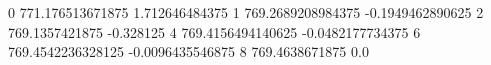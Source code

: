 0 771.176513671875 1.712646484375
1 769.2689208984375 -0.1949462890625
2 769.1357421875 -0.328125
4 769.4156494140625 -0.0482177734375
6 769.4542236328125 -0.0096435546875
8 769.4638671875 0.0
